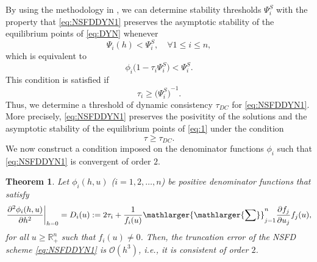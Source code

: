 \documentclass[12pt]{article}
\newtheorem{theorem}{Theorem}[section]
\theoremstyle{definition}
\theoremstyle{remark}
\numberwithin{equation}{section}
\begin{document}
By using the methodology in \cite{Alalhareth1, Alalhareth2, Dimitrov5, Dimitrov6, Wood1}, we can determine stability thresholds $\Psi_i^S$ with the property that \eqref{eq:NSFDDYN1} preserves the asymptotic stability of the equilibrium points of \eqref{eq:DYN} whenever
\begin{equation*}
\Psi_i(h) < \Psi_i^S, \quad \forall 1 \leq i \leq n,
\end{equation*}
which is equivalent to
\begin{equation*}
\phi_i\big(1 - \tau_i\Psi_i^S\big) < \Psi_i^S.
\end{equation*}
This condition is satisfied if
\begin{equation}\label{eq:GNSFD7}
\tau_i \geq {\big(\Psi_i^S\big)}^{-1}.
\end{equation}
Thus, we determine a threshold of dynamic consistency $\tau_{DC}$ for \eqref{eq:NSFDDYN1}. More precisely, \eqref{eq:NSFDDYN1} preserves the posivitity of the solutions and the asymptotic stability of the equilibrium points of \eqref{eq:1} under the condition
\begin{equation}\label{eq:GNSFD8}
\tau \geq \tau_{DC}.
\end{equation}
We now construct a condition imposed on the denominator functions $\phi_i$ such that \eqref{eq:NSFDDYN1} is convergent of order $2$.
\begin{theorem}\label{Theorem2ndNSFD}
Let $\phi_i(h, u)$ ($i = 1, 2, \ldots, n$) be positive denominator functions that satisfy
\begin{equation}\label{eq:2ndGNSFD}
\dfrac{\partial^2 \phi_i(h, u)}{\partial h^2}\bigg|_{h = 0} = D_i(u) := 2\tau_i + \dfrac{1}{f_i(u)}\mathlarger{\mathlarger{\sum}}_{j = 1}^n\dfrac{\partial f_j}{\partial u_j}f_j(u),
\end{equation}
for all $u \geq \mathbb{R}_+^n$ such that $f_i(u) \ne 0$. Then, the truncation error of the NSFD scheme \eqref{eq:NSFDDYN1} is $\mathcal{O}(h^3)$, i.e., it is consistent of order $2$.
\end{theorem}
%
%
%
%
\end{document}
